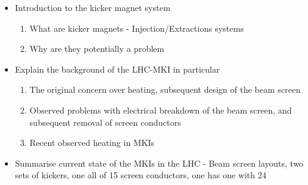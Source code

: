 
\begin{itemize}
\item{Introduction to the kicker magnet system}
\begin{enumerate}
\item{What are kicker magnets - Injection/Extractions systems}
\item{Why are they potentially a problem}
\end{enumerate}
\item{Explain the background of the LHC-MKI in particular}
\begin{enumerate}
\item{The original concern over heating, subsequent design of the beam screen}
\item{Observed problems with electrical breakdown of the beam screen, and subsequent removal of screen conductors}
\item{Recent observed heating in MKIs}
\end{enumerate}
\item{Summarise current state of the MKIs in the LHC - Beam screen layouts, two sets of kickers, one all of 15 screen conductors, one has one with 24}
\end{itemize}